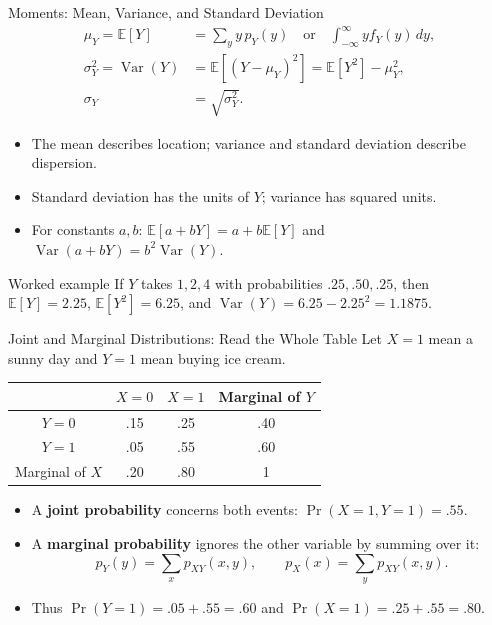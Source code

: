 \documentclass[10pt,aspectratio=169]{beamer}
\newcommand{\E}{\mathbb{E}}
\newcommand{\Var}{\operatorname{Var}}
\newcommand{\Prb}{\operatorname{Pr}}
\begin{document}
\begin{frame}{Moments: Mean, Variance, and Standard Deviation}
\begin{align*}
\mu_Y=\E[Y]&=\sum_y y\,p_Y(y)
\quad\text{or}\quad \int_{-\infty}^{\infty}y f_Y(y)\,dy,\\
\sigma_Y^2=\Var(Y)&=\E[(Y-\mu_Y)^2]=\E[Y^2]-\mu_Y^2,\\
\sigma_Y&=\sqrt{\sigma_Y^2}.
\end{align*}
\begin{itemize}
\item The mean describes location; variance and standard deviation describe dispersion.
\item Standard deviation has the units of $Y$; variance has squared units.
\item For constants $a,b$: $\E[a+bY]=a+b\E[Y]$ and $\Var(a+bY)=b^2\Var(Y)$.
\end{itemize}
\begin{block}{Worked example}
If $Y$ takes $1,2,4$ with probabilities $.25,.50,.25$, then
$\E[Y]=2.25$, $\E[Y^2]=6.25$, and $\Var(Y)=6.25-2.25^2=1.1875$.
\end{block}
\end{frame}

\begin{frame}{Joint and Marginal Distributions: Read the Whole Table}
Let $X=1$ mean a sunny day and $Y=1$ mean buying ice cream.
\begin{center}
\begin{tabular}{c|cc|c}
 & $X=0$ & $X=1$ & Marginal of $Y$\\ \hline
$Y=0$ & .15 & .25 & .40\\
$Y=1$ & .05 & .55 & .60\\ \hline
Marginal of $X$ & .20 & .80 & 1
\end{tabular}
\end{center}
\begin{itemize}
\item A \textbf{joint probability} concerns both events: $\Prb(X=1,Y=1)=.55$.
\item A \textbf{marginal probability} ignores the other variable by summing over it:
\[
p_Y(y)=\sum_x p_{XY}(x,y),\qquad
p_X(x)=\sum_y p_{XY}(x,y).
\]
\item Thus $\Prb(Y=1)=.05+.55=.60$ and $\Prb(X=1)=.25+.55=.80$.
\end{itemize}
\end{frame}
\end{document}
